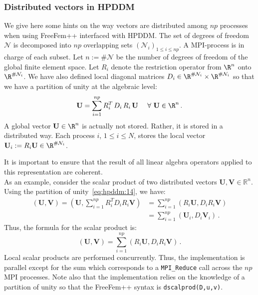 \def\parallelScript{../examples++-hpddm/heat-3d.edp}

\lstinput[linerange=SolvePlot-SolvePlotEnd]{\parallelScript}


\subsubsection{Distributed vectors in HPDDM} %
\label{sub:linear}
We give here some hints on the way vectors are distributed among $np$ processes when using FreeFem++ interfaced with HPDDM. The set of degrees of freedom ${\mathcal N}$ is decomposed into $np$ overlapping sets $({\mathcal N}_i)_{1\le i\le np}$. A MPI-process is in charge of each subset. Let $n:=\#{\mathcal N}$ be the number of degrees of freedom of the global finite element space. Let $R_i$ denote the restriction operator from $\R^n$ onto $\R^{\#{\mathcal N}_i}$. We have also defined local diagonal matrices $D_i\in \R^{\#{\mathcal N}_i}\times \R^{\#{\mathcal N}_i}$ so that we have a partition of unity at the algebraic level:
\begin{equation}
	\label{eq:hpddm:14}
  {\mathbf U} = \sum_{i=1}^{np} R_i^T\,D_i\,R_i\,{\mathbf U}\ \ \ \ \forall\ {\mathbf U}\in\R^n\,.
\end{equation}
A global vector ${\mathbf U}\in\R^n$ is actually not stored. Rather, it is stored in a distributed way. Each process $i$, $1\le i\le N$, stores the local vector ${\mathbf U}_i:=R_i {\mathbf U}\in \R^{\#{\mathcal N}_i}$. 

 It is important to ensure that the result of all linear algebra operators applied to this representation are coherent.\\
As an example, consider the scalar product of two distributed vectors ${\mathbf U}, {\mathbf V} \in \mathbb{R}^{n}$. Using the partition of unity~\eqref{eq:hpddm:14}, we have:
\begin{align*}({\mathbf U}, {\mathbf V}) = \left({\mathbf U}, \sum_{i=1}^{np} R_i^T D_i R_i {\mathbf V}\right) &= \sum_{i=1}^{np} (R_i {\mathbf U}, D_i R_i {\mathbf V})\\
&=\sum_{i=1}^{np} \left({\mathbf U}_i, D_i {\mathbf V}_i\right)\,. 
\end{align*}
Thus, the formula for the scalar product is:
\begin{equation*}
({\mathbf U}, {\mathbf V}) = \sum_{i = 1}^{np} (R_i {\mathbf U}, D_i R_i {\mathbf V})\,.
\end{equation*}
Local scalar products are performed concurrently. Thus, the implementation is parallel except for the sum which corresponds to a {\tt MPI\_Reduce} call across the $np$ MPI processes. Note also that the implementation relies on the knowledge of a partition of unity so that the FreeFem++ syntax is {\tt dscalprod(D,u,v)}.\\

